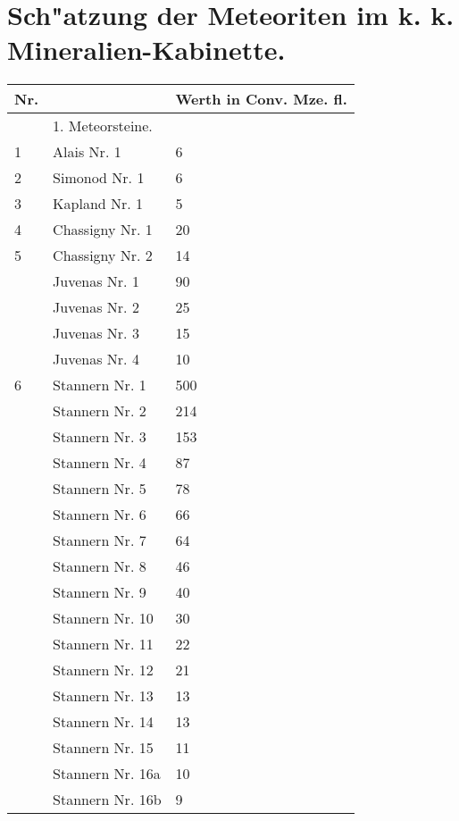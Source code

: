 \documentclass[a4paper, 11pt, oneside, polutonikogreek, german]{article}
\begin{document}
\section{Sch"atzung der Meteoriten im k. k. Mineralien-Kabinette.}
\begin{center}
    \begin{longtable}{|l|l|l|}
    \hline
        Nr. &   & Werth in Conv. Mze. fl. \\ \hline
          & 1. Meteorsteine. &   \\ \hline
        1 & Alais Nr. 1 & 6 \\ \hline
        2 & Simonod Nr. 1 & 6 \\ \hline
        3 & Kapland Nr. 1 & 5 \\ \hline
        4 & Chassigny Nr. 1 & 20 \\ \hline
        5 & Chassigny Nr. 2 & 14 \\ \hline
          & Juvenas Nr. 1 & 90 \\ \hline
          & Juvenas Nr. 2 & 25 \\ \hline
          & Juvenas Nr. 3 & 15 \\ \hline
          & Juvenas Nr. 4 & 10 \\ \hline
        6 & Stannern Nr. 1 & 500 \\ \hline
          & Stannern Nr. 2 & 214 \\ \hline
          & Stannern Nr. 3 & 153 \\ \hline
          & Stannern Nr. 4 & 87 \\ \hline
          & Stannern Nr. 5 & 78 \\ \hline
          & Stannern Nr. 6 & 66 \\ \hline
          & Stannern Nr. 7 & 64 \\ \hline
          & Stannern Nr. 8 & 46 \\ \hline
          & Stannern Nr. 9 & 40 \\ \hline
          & Stannern Nr. 10 & 30 \\ \hline
          & Stannern Nr. 11 & 22 \\ \hline
          & Stannern Nr. 12 & 21 \\ \hline
          & Stannern Nr. 13 & 13 \\ \hline
          & Stannern Nr. 14 & 13 \\ \hline
          & Stannern Nr. 15 & 11 \\ \hline
          & Stannern Nr. 16a & 10 \\ \hline
          & Stannern Nr. 16b & 9 \\ \hline

\end{longtable}
\end{center}
\end{document}
